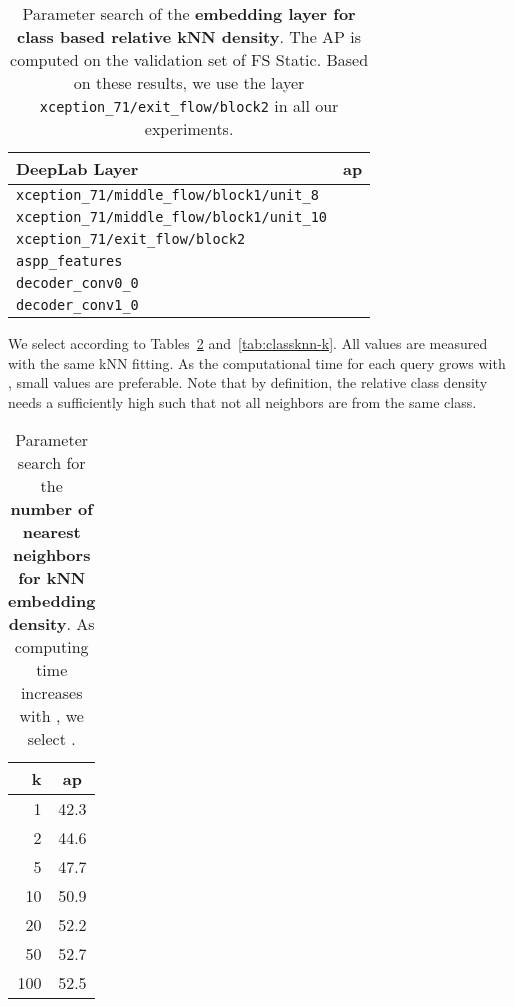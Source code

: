 \begin{table}[h!]
\centering
\footnotesize
\begin{tabular}{lc}
\toprule
DeepLab Layer & \ac{ap} \\
\midrule
\scriptsize{\verb|xception_71/middle_flow/block1/unit_8|} &  \\
\scriptsize{\verb|xception_71/middle_flow/block1/unit_10|} &  \\
\scriptsize{\verb|xception_71/exit_flow/block2|}          &  \\
\scriptsize{\verb|aspp_features|}                         & \\
\scriptsize{\verb|decoder_conv0_0|}                       &  \\
\scriptsize{\verb|decoder_conv1_0|}                       &  \\
\bottomrule
\end{tabular}
\vspace{3mm}
\caption{Parameter search of the \textbf{embedding layer for class based relative kNN density}. The AP is computed on the validation set of FS Static. Based on these results, we use the layer \texttt{xception\_71/exit\_flow/block2} in all our experiments.}
\label{tab:classknn:layers}
\end{table}

We select  according to Tables~\ref{tab:knn-k} and~\ref{tab:classknn-k}. All values are measured with the same kNN fitting. As the computational time for each query grows with , small values are preferable. Note that by definition, the relative class density needs a sufficiently high  such that not all neighbors are from the same class. 

\begin{table}[htb]
\centering
\footnotesize
\begin{tabular}{rc}
\toprule
k & \ac{ap} \\
\midrule
      1 & 42.3\\
      2 & 44.6 \\
      5 & 47.7\\
      10 & 50.9 \\
      20 & 52.2\\
      50 & 52.7 \\
      100 & 52.5\\
\bottomrule
\end{tabular}
\vspace{3mm}
\caption{Parameter search for the \textbf{number of nearest neighbors for kNN embedding density}. As computing time increases with , we select .}
\label{tab:knn-k}
\end{table}

